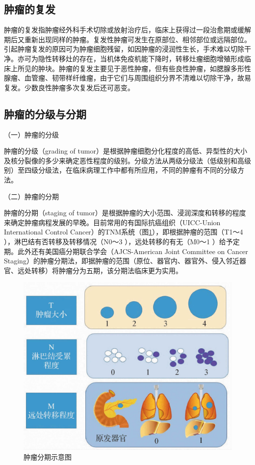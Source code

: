 \subsection{肿瘤的复发}

肿瘤的复发指肿瘤经外科手术切除或放射治疗后，临床上获得过一段治愈期或缓解期后又重新出现同样的肿瘤。复发性肿瘤可发生在原部位、相邻部位或远隔部位。引起肿瘤复发的原因可为肿瘤细胞残留，如因肿瘤的浸润性生长，手术难以切除干净。亦可为隐性转移灶的存在，当机体免疫机能下降时，转移灶瘤细胞增殖形成临床上所见的肿块。肿瘤的复发主要见于恶性肿瘤，但有些良性肿瘤，如腮腺多形性腺瘤、血管瘤、韧带样纤维瘤，由于它们与周围组织分界不清难以切除干净，故易复发。少数良性肿瘤多次复发后还可恶变。

\subsection{肿瘤的分级与分期}

{（一）肿瘤的分级}

肿瘤的分级（grading of
tumor）是根据肿瘤细胞分化程度的高低、异型性的大小及核分裂像的多少来确定恶性程度的级别。分级方法从两级分级法（低级别和高级别）至四级分级法，在临床病理工作中都有所应用，不同的肿瘤有不同的分级方法。

{（二）肿瘤的分期}

肿瘤的分期（staging of
tumor）是根据肿瘤的大小范围、浸润深度和转移的程度来确定肿瘤病程发展的早晚。目前常用的有国际抗癌组织（UICC-Union
International Control
Cancer）的TNM系统（图\ref{fig5-10}），即根据肿瘤的范围（T{1～4}
），淋巴结有否转移及转移情况（N{0～3} ），远处转移的有无（M{0～1}
）给予定期。此外还有美国癌分期联合学会（AJCS-American Joint Committee on
Cancer
Staging）的肿瘤分期法，即据肿瘤的范围（原位、器官内、器官外、侵入邻近器官、远处转移）将肿瘤分为五期，该分期法临床更为实用。

\begin{figure}[!htbp]
 \centering
 \includegraphics{./images/Image00077.jpg}
 \caption{肿瘤分期示意图}
 \label{fig5-10}
  \end{figure}


